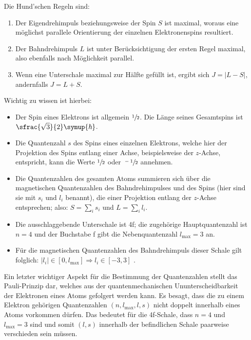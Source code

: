     Die Hund'schen Regeln sind\cite{Versuchsanleitung}:
    \begin{enumerate}
        \item Der Eigendrehimpuls beziehungsweise der Spin $S$ ist maximal, woraus eine möglichst parallele Orientierung 
            der einzelnen Elektronenspins resultiert.    
        \item Der Bahndrehimpuls $L$ ist unter Berücksichtigung der ersten Regel maximal, also ebenfalls nach Möglichkeit parallel. 
        \item Wenn eine Unterschale maximal zur Hälfte gefüllt ist, ergibt sich ${J=|L-S|}$, andernfalls ${J=L+S}$.
    \end{enumerate}
    Wichtig zu wissen ist hierbei: 
    \begin{itemize}
        \item Der Spin eines Elektrons ist allgemein $\sfrac{1}{2}$. Die Länge seines Gesamtspins ist $\sfrac{\sqrt{3}}{2} \symup{\hbar}$. 
        \item Die Quantenzahl $s$ des Spins eines einzelnen Elektrons, welche hier der Projektion des Spins entlang einer Achse, beispielsweise der $z$-Achse, entspricht, kann die Werte $\sfrac{1}{2}$ oder $\sfrac{-1}{2}$ annehmen.   
        \item Die Quantenzahlen des gesamten Atoms summieren sich über die magnetischen Quantenzahlen des Bahndrehimpulses und des Spins (hier sind sie mit $s_i$ und $l_i$ benannt), die einer Projektion entlang der $z$-Achse entsprechen; also: $S=\sum_{i} s_i$ und $L=\sum_{i} l_i$.
        \item Die ausschlaggebende Unterschale ist 4f; die zugehörige Hauptquantenzahl ist ${n=4}$ und der Buchstabe f gibt 
            die Nebenquantenzahl $l_\text{max}=3$ an.
        \item Für die magnetischen Quantenzahlen des Bahndrehimpuls dieser Schale gilt folglich: $|l_i| \in [0,l_\text{max}] \Rightarrow l_i \in [-3,3]$ .
    \end{itemize}

    Ein letzter wichtiger Aspekt für die Bestimmung der Quantenzahlen stellt das Pauli-Prinzip dar, welches aus der quantenmechanischen Ununterscheidbarkeit der Elektronen eines Atoms gefolgert werden kann. 
    Es besagt, dass die zu einem Elektron gehörigen Quantenzahlen $(n,l_\text{max},l,s)$ nicht doppelt innerhalb eines Atoms vorkommen dürfen. 
    Das bedeutet für die 4f-Schale, dass $n=4$ und $l_\text{max}=3$ sind und somit $(l,s)$ innerhalb der befindlichen Schale paarweise verschieden sein müssen. 
    
